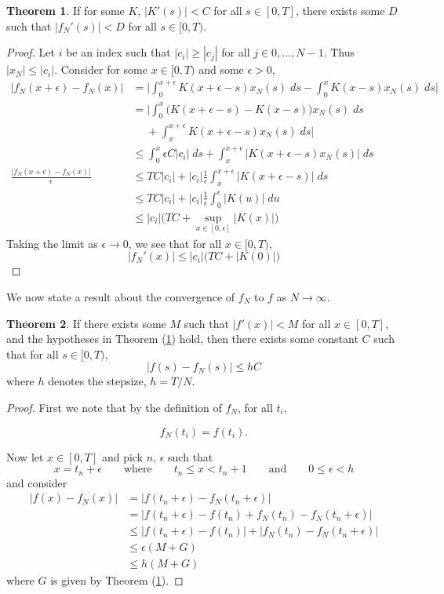 \documentclass[11pt]{article}
\numberwithin{equation}{section}
\theoremstyle{definition}
\newtheorem{theorem}{Theorem}[section]
\newcommand{\eq}[1]{\begin{align*}#1\end{align*}}
\newcommand{\eqn}[2]{
  \begin{equation}
    \label{#1}
    #2
  \end{equation}
}
\newcommand{\thr}[1]{Theorem (\ref{#1})}
\begin{document}
\begin{theorem}
  \label{f_nderiv}
  If for some $K$, $|K'(s)| < C$ for all $s \in [0, T]$, there exists some $D$ such that $|f_N'(s)| < D$ for all $s \in [0, T)$.
\end{theorem}
\begin{proof}
Let $i$ be an index such that $|c_i| \geq |c_j|$ for all $j \in 0, ..., N-1$. Thus $|x_N| \leq |c_i|$.
Consider for some $x \in [0, T)$ and some $\epsilon > 0$,
\begin{align}
  \nonumber
  |f_N(x+\epsilon) - f_N(x)|
  &=
  \bigg|
  \int_0^{x+\epsilon} K(x+\epsilon - s)x_N(s)
  \; ds
  - \int_0^x K(x - s)x_N(s) 
  \; ds
  \bigg|
  \\
%
%
  \nonumber
  &=
  \bigg|
  \int_0^x \big(
    K(x+\epsilon - s) - K(x - s)
  \big)
  x_N(s)
  \; ds
  \\
  \nonumber
  &\quad
  \;
  + \int_x^{x+\epsilon} K(x+\epsilon-s)x_N(s)
  \; ds
  \bigg|
  \\
%
%
  \nonumber
  &\leq
  \int_0^x \epsilon C |c_i|
  \; ds
  + \int_{x}^{x+\epsilon} |K(x+\epsilon-s)x_N(s)|
  \; ds
  \\
%
%
  \nonumber
  \frac{|f_N(x+\epsilon) - f_N(x)|}{\epsilon}
  &\leq
  TC|c_i| + 
  |c_i|
  \frac{1}{\epsilon}
  \int_x^{x+\epsilon} |K(x+\epsilon - s)|
  \; ds
  \\
%
%
  \nonumber
  &\leq
  TC|c_i|
  +
  |c_i|
  \frac{1}{\epsilon}
  \int_0^\epsilon |K(u)|
  \; du
  \\
%
%
  \nonumber
  &\leq
  |c_i|\Big(
    TC
    + \sup_{x\in[0, \epsilon]} |K(x)|
  \Big)
\end{align}
Taking the limit as $\epsilon \rightarrow 0$, we see that for all $x \in [0, T)$,
$$
  |f_N'(x)|
  \leq
  |c_i|\Big(
    TC
    + |K(0)|
  \Big)
$$
\end{proof}

We now state a result about the convergence of $f_N$ to $f$ as $N \rightarrow \infty$.

\begin{theorem}
  \label{f_dist_bound}
  If there exists some $M$ such that $|f'(x)| < M$ for all $x \in [0, T]$,
  and the hypotheses in \thr{f_nderiv} hold,
  then there exists some constant $C$ such that for all $s \in [0, T)$,
  $$
    |f(s) - f_N(s)|
    \leq
    hC
  $$
  where $h$ denotes the stepsize, $h = T/N$.
\end{theorem}
\begin{proof}
First we note that by the definition of $f_N$, for all $t_i$,
\eqn{f_ndefin_relation}{
  f_N(t_i) = f(t_i).
}
Now let $x \in [0, T]$ and pick $n$, $\epsilon$ such that
$$
  x = t_n + \epsilon
  \qquad
  \text{where}
  \qquad
  t_n \leq x < t_n+1
  \qquad
  \text{and}
  \qquad
  0 \leq \epsilon < h
$$
and consider
\eq{
  |f(x) - f_N(x)| &= |f(t_n + \epsilon) - f_N(t_n + \epsilon)| \\
  &= |f(t_n + \epsilon) - f(t_n) + f_N(t_n) - f_N(t_n + \epsilon)| \\
  &\leq |f(t_n + \epsilon) - f(t_n)| + |f_N(t_n) - f_N(t_n + \epsilon)| \\
  &\leq \epsilon (M + G) \\
  &\leq h(M + G)
}
where $G$ is given by \thr{f_nderiv}.
\end{proof}
\end{document}
